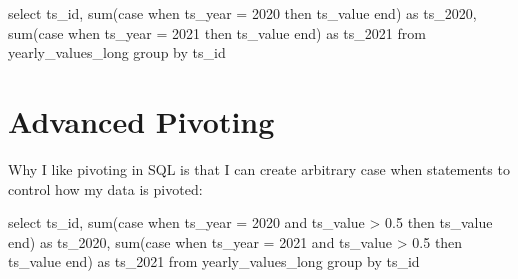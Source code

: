 \documentclass[
  letterpaper,
  DIV=11,
  numbers=noendperiod]{scrreprt}
\newenvironment{Shaded}{\begin{snugshade}}{\end{snugshade}}
\newcommand{\ControlFlowTok}[1]{\textcolor[rgb]{0.00,0.23,0.31}{#1}}
\newcommand{\DecValTok}[1]{\textcolor[rgb]{0.68,0.00,0.00}{#1}}
\newcommand{\FloatTok}[1]{\textcolor[rgb]{0.68,0.00,0.00}{#1}}
\newcommand{\FunctionTok}[1]{\textcolor[rgb]{0.28,0.35,0.67}{#1}}
\newcommand{\KeywordTok}[1]{\textcolor[rgb]{0.00,0.23,0.31}{#1}}
\newcommand{\NormalTok}[1]{\textcolor[rgb]{0.00,0.23,0.31}{#1}}
\newcommand{\OperatorTok}[1]{\textcolor[rgb]{0.37,0.37,0.37}{#1}}
\begin{document}
\begin{Shaded}
\begin{Highlighting}[]

\KeywordTok{select} 
\NormalTok{  ts\_id,}
  \FunctionTok{sum}\NormalTok{(}\ControlFlowTok{case} \ControlFlowTok{when}\NormalTok{ ts\_year }\OperatorTok{=} \DecValTok{2020} \ControlFlowTok{then}\NormalTok{ ts\_value }\ControlFlowTok{end}\NormalTok{) }\KeywordTok{as}\NormalTok{ ts\_2020,}
  \FunctionTok{sum}\NormalTok{(}\ControlFlowTok{case} \ControlFlowTok{when}\NormalTok{ ts\_year }\OperatorTok{=} \DecValTok{2021} \ControlFlowTok{then}\NormalTok{ ts\_value }\ControlFlowTok{end}\NormalTok{) }\KeywordTok{as}\NormalTok{ ts\_2021}
\KeywordTok{from}\NormalTok{ yearly\_values\_long}
\KeywordTok{group} \KeywordTok{by}\NormalTok{ ts\_id}
\end{Highlighting}
\end{Shaded}


\hypertarget{advanced-pivoting}{%
\chapter{Advanced Pivoting}\label{advanced-pivoting}}

Why I like pivoting in SQL is that I can create arbitrary case when
statements to control how my data is pivoted:

\begin{Shaded}
\begin{Highlighting}[]

\KeywordTok{select} 
\NormalTok{  ts\_id,}
  \FunctionTok{sum}\NormalTok{(}\ControlFlowTok{case} \ControlFlowTok{when}\NormalTok{ ts\_year }\OperatorTok{=} \DecValTok{2020} \KeywordTok{and}\NormalTok{ ts\_value }\OperatorTok{\textgreater{}} \FloatTok{0.5} \ControlFlowTok{then}\NormalTok{ ts\_value }\ControlFlowTok{end}\NormalTok{) }\KeywordTok{as}\NormalTok{ ts\_2020,}
  \FunctionTok{sum}\NormalTok{(}\ControlFlowTok{case} \ControlFlowTok{when}\NormalTok{ ts\_year }\OperatorTok{=} \DecValTok{2021} \KeywordTok{and}\NormalTok{ ts\_value }\OperatorTok{\textgreater{}} \FloatTok{0.5} \ControlFlowTok{then}\NormalTok{ ts\_value }\ControlFlowTok{end}\NormalTok{) }\KeywordTok{as}\NormalTok{ ts\_2021}
\KeywordTok{from}\NormalTok{ yearly\_values\_long}
\KeywordTok{group} \KeywordTok{by}\NormalTok{ ts\_id}
\end{Highlighting}
\end{Shaded}

\end{document}
